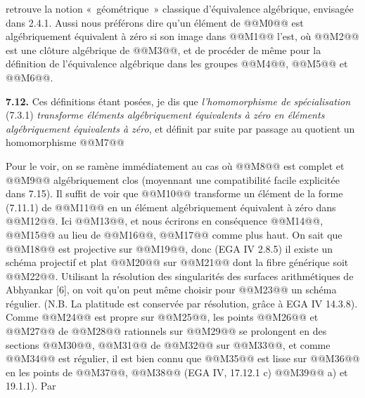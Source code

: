 
retrouve la notion «~géométrique~» classique d'équivalence algébrique, envisagée dans 2.4.1. Aussi nous préférons dire qu'un élément de @@M0@@ est algébriquement équivalent à zéro si son image dans @@M1@@ l'est, où @@M2@@ est une clôture algébrique de @@M3@@, et de procéder de même pour la définition de l'équivalence algébrique dans les groupes @@M4@@, @@M5@@ et @@M6@@.

\textbf{7.12.} Ces définitions étant posées, je dis que \emph{l'homomorphisme de spécialisation} (7.3.1) \emph{transforme éléments algébriquement équivalents à zéro en éléments algébriquement équivalents à zéro}, et définit par suite par passage au quotient un homomorphisme
@@M7@@

Pour le voir, on se ramène immédiatement au cas où @@M8@@ est complet et @@M9@@ algébriquement clos (moyennant une compatibilité facile explicitée dans 7.15). Il suffit de voir que @@M10@@ transforme un élément de la forme (7.11.1) de @@M11@@ en un élément algébriquement équivalent à zéro dans @@M12@@. Ici @@M13@@, et nous écrirons en conséquence @@M14@@, @@M15@@ au lieu de @@M16@@, @@M17@@ comme plus haut. On sait que @@M18@@ est projective sur @@M19@@, donc (EGA IV 2.8.5) il existe un schéma projectif et plat @@M20@@ sur @@M21@@ dont la fibre générique soit @@M22@@. Utilisant la résolution des singularités des surfaces arithmétiques de Abhyankar [6], on voit qu'on peut même choisir pour @@M23@@ un schéma régulier. (N.B. La platitude est conservée par résolution, grâce à EGA IV 14.3.8). Comme @@M24@@ est propre sur @@M25@@, les points @@M26@@ et @@M27@@ de @@M28@@ rationnels sur @@M29@@ se prolongent en des sections @@M30@@, @@M31@@ de @@M32@@ sur @@M33@@, et comme @@M34@@ est régulier, il est bien connu que @@M35@@ est lisse sur @@M36@@ en les points de @@M37@@, @@M38@@ (EGA IV, 17.12.1 c) @@M39@@ a) et 19.1.1). Par
